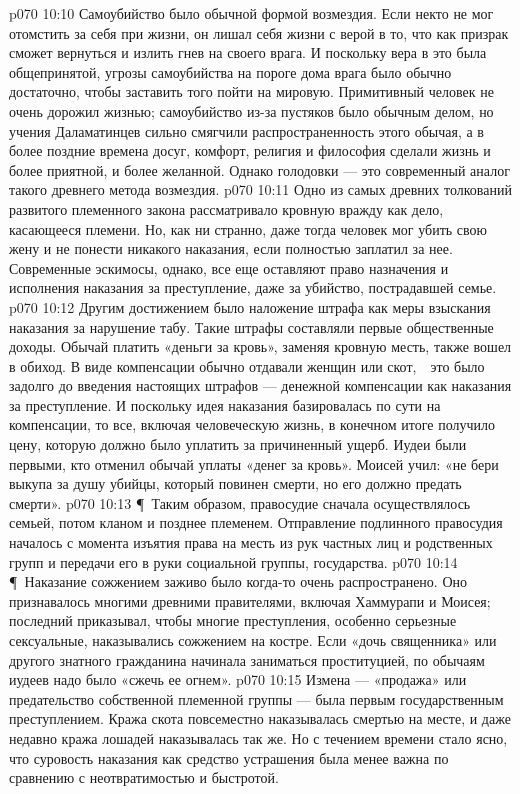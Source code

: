 \vs p070 10:10 Самоубийство было обычной формой возмездия. Если некто не мог отомстить за себя при жизни, он лишал себя жизни с верой в то, что как призрак сможет вернуться и излить гнев на своего врага. И поскольку вера в это была общепринятой, угрозы самоубийства на пороге дома врага было обычно достаточно, чтобы заставить того пойти на мировую. Примитивный человек не очень дорожил жизнью; самоубийство из\hyp{}за пустяков было обычным делом, но учения Даламатинцев сильно смягчили распространенность этого обычая, а в более поздние времена досуг, комфорт, религия и философия сделали жизнь и более приятной, и более желанной. Однако голодовки --- это современный аналог такого древнего метода возмездия.
\vs p070 10:11 Одно из самых древних толкований развитого племенного закона рассматривало кровную вражду как дело, касающееся племени. Но, как ни странно, даже тогда человек мог убить свою жену и не понести никакого наказания, если полностью заплатил за нее. Современные эскимосы, однако, все еще оставляют право назначения и исполнения наказания за преступление, даже за убийство, пострадавшей семье.
\vs p070 10:12 Другим достижением было наложение штрафа как меры взыскания наказания за нарушение табу. Такие штрафы составляли первые общественные доходы. Обычай платить «деньги за кровь», заменяя кровную месть, также вошел в обиход. В виде компенсации обычно отдавали женщин или скот,　это было задолго до введения настоящих штрафов --- денежной компенсации как наказания за преступление. И поскольку идея наказания базировалась по сути на компенсации, то все, включая человеческую жизнь, в конечном итоге получило цену, которую должно было уплатить за причиненный ущерб. Иудеи были первыми, кто отменил обычай уплаты «денег за кровь». Моисей учил: «не бери выкупа за душу убийцы, который повинен смерти, но его должно предать смерти».
\vs p070 10:13 \P\ Таким образом, правосудие сначала осуществлялось семьей, потом кланом и позднее племенем. Отправление подлинного правосудия началось с момента изъятия права на месть из рук частных лиц и родственных групп и передачи его в руки социальной группы, государства.
\vs p070 10:14 \P\ Наказание сожжением заживо было когда\hyp{}то очень распространено. Оно признавалось многими древними правителями, включая Хаммурапи и Моисея; последний приказывал, чтобы многие преступления, особенно серьезные сексуальные, наказывались сожжением на костре. Если «дочь священника» или другого знатного гражданина начинала заниматься проституцией, по обычаям иудеев надо было «сжечь ее огнем».
\vs p070 10:15 Измена --- «продажа» или предательство собственной племенной группы --- была первым государственным преступлением. Кража скота повсеместно наказывалась смертью на месте, и даже недавно кража лошадей наказывалась так же. Но с течением времени стало ясно, что суровость наказания как средство устрашения была менее важна по сравнению с неотвратимостью и быстротой.
